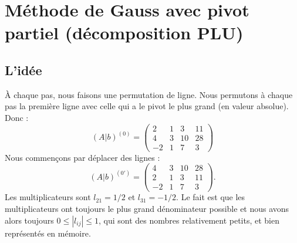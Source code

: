 \section{Méthode de Gauss avec pivot partiel (décomposition PLU)}

\subsection{L'idée}

À chaque pas, nous faisons une permutation de ligne. Nous permutons à chaque pas la première ligne avec celle qui a le pivot le plus grand (en valeur absolue). Donc :
\begin{equation}
	(A|b)^{(0)}=\begin{pmatrix}
		2  & 1 & 3  & 11 \\
		4  & 3 & 10 & 28 \\
		-2 & 1 & 7  & 3
	\end{pmatrix}
\end{equation}
Nous commençons par déplacer des lignes :
\begin{equation}
	(A|b)^{(0')}=\begin{pmatrix}
		4  & 3 & 10 & 28 \\
		2  & 1 & 3  & 11 \\
		-2 & 1 & 7  & 3
	\end{pmatrix}.
\end{equation}
Les multiplicateurs sont \( l_{21}=1/2\) et \( l_{31}=-1/2\). Le fait est que les multiplicateurs ont toujours le plus grand dénominateur possible et nous avons alors toujours \( 0\leq | l_{ij} |\leq 1\), qui sont des nombres relativement petits, et bien représentés en mémoire.

